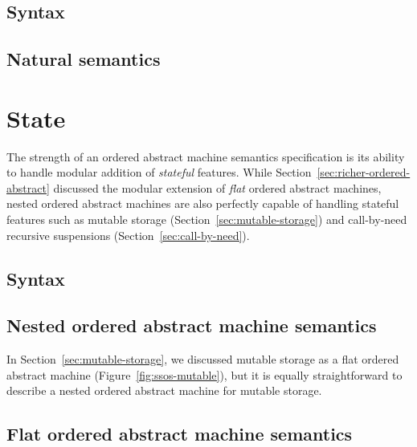 \subsection{Syntax}


\subsection{Natural semantics}
\label{sec:compose-pure}


\section{State}

The strength of an ordered abstract machine semantics specification is
its ability to handle modular addition of {\it stateful}
features. While Section~\ref{sec:richer-ordered-abstract} discussed
the modular extension of {\it flat} ordered abstract machines, nested
ordered abstract machines are also perfectly capable of handling
stateful features such as mutable storage
(Section~\ref{sec:mutable-storage}) and call-by-need recursive
suspensions (Section~\ref{sec:call-by-need}).

\subsection{Syntax}


\subsection{Nested ordered abstract machine semantics}
\label{sec:compose-imp}

In Section~\ref{sec:mutable-storage}, we discussed mutable storage as
a flat ordered abstract machine (Figure~\ref{fig:ssos-mutable}), but
it is equally straightforward to describe a nested ordered abstract
machine for mutable storage.

\bigskip
{}

\subsection{Flat ordered abstract machine semantics}
\label{sec:compose-susp}

